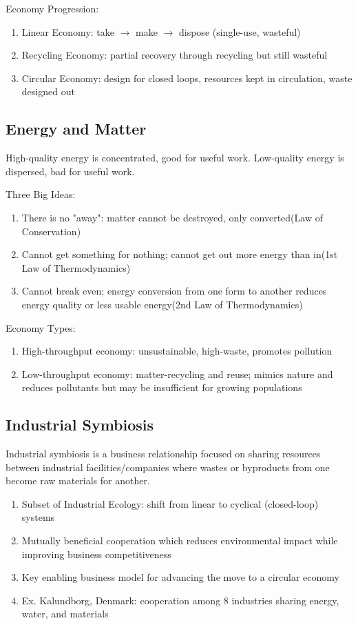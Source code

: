 \documentclass[12pt, a4paper]{article}
\begin{document}
\begin{multicols*}{3}
Economy Progression:
\begin{enumerate}[\roman*.]
  \item Linear Economy: take $\rightarrow$ make $\rightarrow$ dispose (single-use, wasteful)
  \item Recycling Economy: partial recovery through recycling but still wasteful
  \item Circular Economy: design for closed loops, resources kept in circulation, waste designed out
\end{enumerate}

\subsection{Energy and Matter}

High-quality energy is concentrated, good for useful work.
Low-quality energy is dispersed, bad for useful work.

Three Big Ideas:
\begin{enumerate}[\roman*.]
  \item There is no "away": matter cannot be destroyed, only converted\hfill(Law of Conservation)
  \item Cannot get something for nothing; cannot get out more energy than in\hfill(1st Law of Thermodynamics)
  \item Cannot break even; energy conversion from one form to another reduces energy quality or less usable energy\hfill(2nd Law of Thermodynamics)
\end{enumerate}

Economy Types:
\begin{enumerate}[\roman*.]
  \item High-throughput economy: unsustainable, high-waste, promotes pollution
  \item Low-throughput economy: matter-recycling and reuse; mimics nature and reduces pollutants but may be insufficient for growing populations
\end{enumerate}

\colbreak
\subsection{Industrial Symbiosis}

Industrial symbiosis is a business relationship focused on sharing resources between industrial facilities/companies where wastes or byproducts from one become raw materials for another.
\begin{enumerate}[\roman*.]
  \item Subset of Industrial Ecology: shift from linear to cyclical (closed-loop) systems
  \item Mutually beneficial cooperation which reduces environmental impact while improving business competitiveness
  \item Key enabling business model for advancing the move to a circular economy
  \item Ex. Kalundborg, Denmark: cooperation among 8 industries sharing energy, water, and materials 


\end{enumerate}
\end{multicols*}
\end{document}
